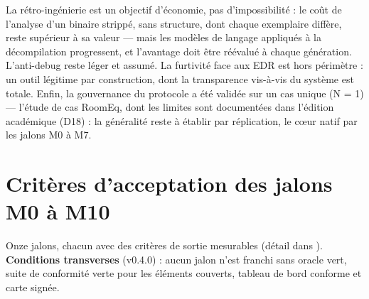 La rétro-ingénierie est un objectif d'économie, pas d'impossibilité : le coût de l'analyse
d'un binaire strippé, sans structure, dont chaque exemplaire diffère, reste supérieur à sa
valeur — mais les modèles de langage appliqués à la décompilation progressent, et
l'avantage doit être réévalué à chaque génération. L'anti-debug reste léger et assumé.
La furtivité face aux EDR est hors périmètre : un outil légitime par construction, dont
la transparence vis-à-vis du système est totale. Enfin, la gouvernance du protocole a été
validée sur un cas unique (N = 1) — l'étude de cas RoomEq, dont les limites sont
documentées dans l'édition académique (D18) : la généralité reste à établir par
réplication, le cœur natif par les jalons M0 à M7.

\section{Critères d'acceptation des jalons M0 à M10}\label{sec:jalons}

Onze jalons, chacun avec des critères de sortie mesurables (détail dans
). \textbf{Conditions transverses} (v0.4.0) : aucun jalon n'est
franchi sans oracle vert, suite de conformité verte pour les éléments couverts, tableau de
bord conforme et carte signée.

